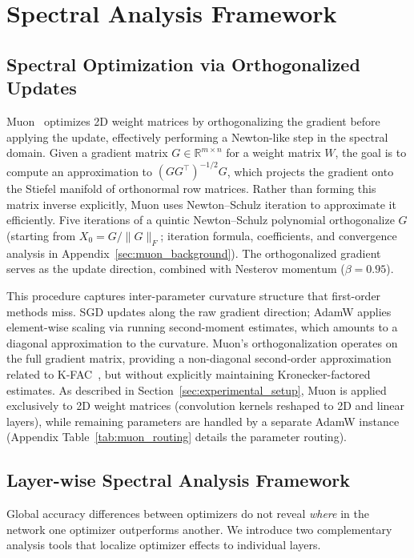 \section{Spectral Analysis Framework}
\label{sec:method}

\subsection{Spectral Optimization via Orthogonalized Updates}

Muon~\cite{jordan2024muon,liu2025muon} optimizes 2D weight matrices by orthogonalizing the gradient before applying the update, effectively performing a Newton-like step in the spectral domain.
Given a gradient matrix $G \in \mathbb{R}^{m \times n}$ for a weight matrix $W$, the goal is to compute an approximation to $(GG^\top)^{-1/2} G$, which projects the gradient onto the Stiefel manifold of orthonormal row matrices.
Rather than forming this matrix inverse explicitly, Muon uses Newton--Schulz iteration to approximate it efficiently.
Five iterations of a quintic Newton--Schulz polynomial orthogonalize $G$ (starting from $X_0 = G/\|G\|_F$; iteration formula, coefficients, and convergence analysis in Appendix~\ref{sec:muon_background}).
The orthogonalized gradient serves as the update direction, combined with Nesterov momentum ($\beta = 0.95$).

This procedure captures inter-parameter curvature structure that first-order methods miss.
SGD updates along the raw gradient direction; AdamW applies element-wise scaling via running second-moment estimates, which amounts to a diagonal approximation to the curvature.
Muon's orthogonalization operates on the full gradient matrix, providing a non-diagonal second-order approximation related to K-FAC~\cite{martens2015kfac}, but without explicitly maintaining Kronecker-factored estimates.
As described in Section~\ref{sec:experimental_setup}, Muon is applied exclusively to 2D weight matrices (convolution kernels reshaped to 2D and linear layers), while remaining parameters are handled by a separate AdamW instance (Appendix Table~\ref{tab:muon_routing} details the parameter routing).

\subsection{Layer-wise Spectral Analysis Framework}

Global accuracy differences between optimizers do not reveal \emph{where} in the network one optimizer outperforms another.
We introduce two complementary analysis tools that localize optimizer effects to individual layers.

